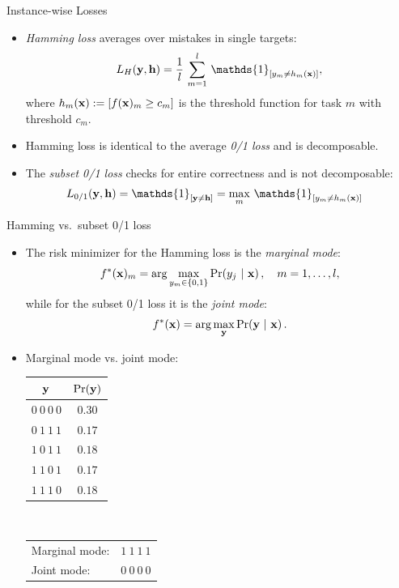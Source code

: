 \documentclass[11pt,compress,t,notes=noshow, xcolor=table]{beamer}
\begin{document}
\begin{frame}{Instance-wise Losses}
	\begin{itemize}
		

		\item \emph{Hamming loss} averages over mistakes in single targets:    
		$$
		\displaystyle L_H(\yv, \mathbf{h}) = \frac{1}{l}  \, \sum_{m=1}^l \, \mathds{1}_{[y_m \neq h_m(\xv)]},
		$$
        where $h_m(\mathbf{x}) := [f(\mathbf{x})_m \geq c_m]$ is the threshold function for task $m$ with threshold $c_m$. 
        
        \item Hamming loss is identical to the average \emph{0/1 loss} %
        and is decomposable.

		\item The \emph{subset 0/1 loss} checks for entire correctness and is not decomposable:  
		\begin{align*}
			\displaystyle L_{0/1}(\yv, \mathbf{h}) & = \mathds{1}_{[ \yv \neq \mathbf{h} ]}  = \max_m \, \mathds{1}_{[y_m \neq  h_m(\xv)]}
		\end{align*}
		
	\end{itemize}
\end{frame}


\begin{frame}{Hamming vs.\ subset 0/1 loss}
	\begin{itemize}
		\item The risk minimizer for the Hamming loss is the  \emph{marginal mode}:
		$$
		f^*(\mathbf{x})_m = \arg \max_{y_m \in \{0,1\}} \Pr( y_j  ~|~ \mathbf{x} )\,, \quad m = 1,\ldots,l,
		$$
		while for the subset 0/1 loss it is the \emph{joint mode}:
		$$
		f^*(\mathbf{x}) = \arg \max_{\mathbf{y}} \Pr(\mathbf{y} ~|~ \mathbf{x}) \,.
		$$
		\item Marginal mode vs. joint mode:\\[6pt]
		\begin{center}
			\begin{tabular}{@{}cc@{}}
				\toprule
				$\mathbf{y}$ & $\Pr(\mathbf{y})$ \\
				\hline
				$0~0~0~0$ & $0.30$ \\
				$0~1~1~1$ & $0.17$ \\
				$1~0~1~1$ & $0.18$ \\
				$1~1~0~1$ & $0.17$ \\
				$1~1~1~0$ & $0.18$ \\
				\toprule
			\end{tabular}
			$\qquad$
			\footnotesize{
				\begin{tabular}{lr}
					Marginal mode: & $1~1~1~1$ \\
					Joint mode: & $0~0~0~0$ \\
				\end{tabular}
			}
		\end{center}
	\end{itemize}
\end{frame}
\end{document}
